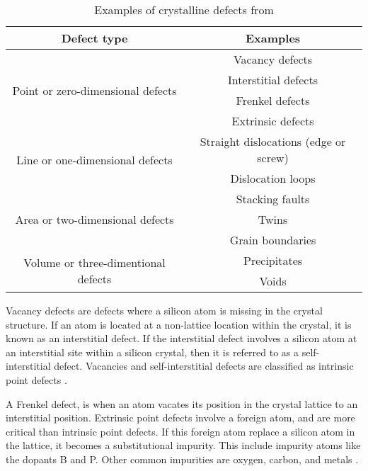 \begin{table}[H]
\begin{tabular}{|c|c|}

\hline
\textbf{Defect type} & \textbf{Examples} \\ \hline

\multirow{4}{*}{Point or zero-dimensional defects} & Vacancy defects \\
 & Interstitial defects \\
 & Frenkel defects \\
 & Extrinsic defects \\ \hline
 
\multirow{2}{*}{Line or one-dimensional defects} & Straight dislocations (edge or screw) \\
 & Dislocation loops \\ \hline
 
\multirow{3}{*}{Area or two-dimensional defects} & Stacking faults \\
 & Twins \\
 & Grain boundaries \\ \hline

\multirow{2}{*}{Volume or three-dimentional defects} & Precipitates \\
 & Voids \\ \hline

\end{tabular}
\caption{Examples of crystalline defects from \cite{siliconfareast}}
\label{tab:crystalline_defects}
\end{table}

Vacancy defects are defects where a silicon atom is missing in the crystal structure. If an atom is located at a non-lattice location within the crystal, it is known as an interstitial defect. If the interstitial defect involves a silicon atom at an interstitial site within a silicon crystal, then it is referred to as a self-interstitial defect. Vacancies and self-interstitial defects are classified as intrinsic point defects \cite{siliconfareast}.
            
A Frenkel defect, is when an atom vacates its position in the crystal lattice to an interstitial position. Extrinsic point defects involve a foreign atom, and are more critical than intrinsic point defects. If this foreign atom replace a silicon atom in the lattice, it becomes a substitutional impurity. This include impurity atoms like the dopants B and P. Other common impurities are oxygen, carbon, and metals \cite{davies88}.


